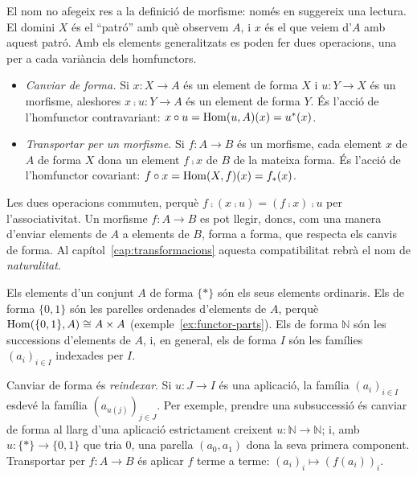 El nom no afegeix res a la definició de morfisme: només en suggereix una lectura. El domini $X$ és el \enquote{patró} amb què observem $A$, i $x$ és el que veiem d'$A$ amb aquest patró. Amb els elements generalitzats es poden fer dues operacions, una per a cada variància dels homfunctors.

\begin{itemize}
\item \emph{Canviar de forma.} Si $x\colon X\to A$ és un element de forma $X$ i $u\colon Y\to X$ és un morfisme, aleshores $x\comp u\colon Y\to A$ és un element de forma $Y$. És l'acció de l'homfunctor contravariant: $x\circ u=\operatorname{Hom}(u,A)(x)=u^*(x)$.
\item \emph{Transportar per un morfisme.} Si $f\colon A\to B$ és un morfisme, cada element $x$ de $A$ de forma $X$ dona un element $f\comp x$ de $B$ de la mateixa forma. És l'acció de l'homfunctor covariant: $f\circ x=\operatorname{Hom}(X,f)(x)=f_*(x)$.
\end{itemize}

Les dues operacions commuten, perquè $f\comp(x\comp u)=(f\comp x)\comp u$ per l'associativitat. Un morfisme $f\colon A\to B$ es pot llegir, doncs, com una manera d'enviar elements de $A$ a elements de $B$, forma a forma, que respecta els canvis de forma. Al capítol~\ref{cap:transformacions} aquesta compatibilitat rebrà el nom de \emph{naturalitat}.

\begin{exemple}
Els elements d'un conjunt $A$ de forma $\{\ast\}$ són els seus elements ordinaris. Els de forma $\{0,1\}$ són les parelles ordenades d'elements de $A$, perquè $\operatorname{Hom}(\{0,1\},A)\cong A\times A$ (exemple~\ref{ex:functor-parts}). Els de forma $\mathbb N$ són les successions d'elements de $A$, i, en general, els de forma $I$ són les famílies $(a_i)_{i\in I}$ indexades per $I$.

Canviar de forma és \emph{reindexar}. Si $u\colon J\to I$ és una aplicació, la família $(a_i)_{i\in I}$ esdevé la família $(a_{u(j)})_{j\in J}$. Per exemple, prendre una subsuccessió és canviar de forma al llarg d'una aplicació estrictament creixent $u\colon\mathbb N\to\mathbb N$; i, amb $u\colon\{\ast\}\to\{0,1\}$ que tria $0$, una parella $(a_0,a_1)$ dona la seva primera component. Transportar per $f\colon A\to B$ és aplicar $f$ terme a terme: $(a_i)_i\mapsto(f(a_i))_i$.
\end{exemple}

